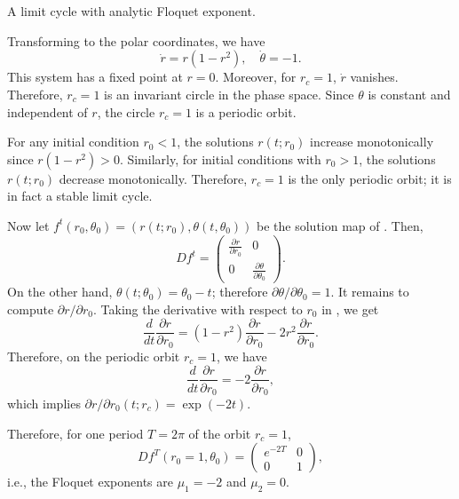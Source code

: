          {A limit cycle with analytic Floquet exponent.}{
Transforming to the polar coordinates, we have
\begin{equation}
\dot r = r(1-r^2), \quad
\dot \theta = -1.
\label{eq:polar}
\end{equation}
This system has a fixed point at $r=0$. Moreover, for $r_c=1$, $\dot r$ vanishes.
Therefore, $r_c=1$ is an invariant circle in the phase space. Since $\theta$ is constant and independent of $r$, the circle $r_c=1$ is a periodic orbit.

For any initial condition $r_0<1$, the solutions $r(t;r_0)$ increase monotonically since
$r(1-r^2)>0$. Similarly, for initial conditions with $r_0>1$, the solutions $r(t;r_0)$
decrease monotonically. Therefore, $r_c=1$ is the only periodic orbit; it is in fact a
stable limit cycle.

Now let $f^t(r_0,\theta_0)=(r(t;r_0),\theta(t,\theta_0))$ be the solution map of
. Then, 
\begin{equation*}
Df^t=
\begin{pmatrix}
\frac{\partial r}{\partial r_0} & 0\\
0 & \frac{\partial \theta}{\partial \theta_0}
\end{pmatrix}.
\end{equation*}
On the other hand, $\theta(t;\theta_0)=\theta_0-t$; therefore $\partial\theta/\partial\theta_0=1$.
It remains to compute $\partial r/\partial r_0$. Taking the derivative with respect to
$r_0$ in , we get
$$ \frac{d}{dt}\frac{\partial r}{\partial r_0}=(1-r^2)\frac{\partial r}{\partial r_0}-2r^2\frac{\partial r}{\partial r_0}.$$
Therefore, on the periodic orbit $r_c=1$, we have
$$ \frac{d}{dt}\frac{\partial r}{\partial r_0}=-2\frac{\partial r}{\partial r_0},$$
which implies $\partial r/\partial r_0(t;r_c)=\exp(-2t)$. 

Therefore, for one period $T=2\pi$ of the orbit $r_c=1$,
\begin{equation*}
Df^T(r_0=1,\theta_0)=
\begin{pmatrix}
e^{-2T} & 0\\
0 & 1
\end{pmatrix},
\end{equation*}
i.e., the Floquet exponents are $\mu_1=-2$ and $\mu_2=0$.
    } %








